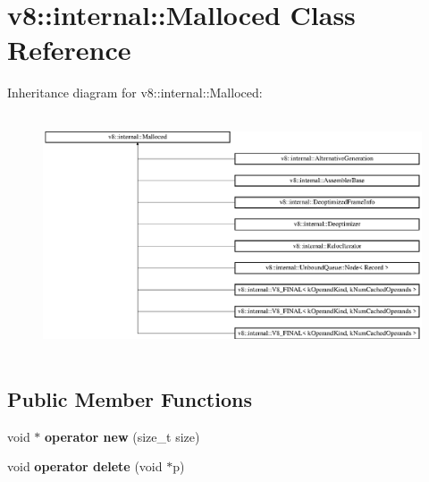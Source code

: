 \hypertarget{classv8_1_1internal_1_1_malloced}{}\section{v8\+:\+:internal\+:\+:Malloced Class Reference}
\label{classv8_1_1internal_1_1_malloced}
Inheritance diagram for v8\+:\+:internal\+:\+:Malloced\+:\begin{figure}[H]
\begin{center}
\leavevmode
\includegraphics[height=7.142857cm]{classv8_1_1internal_1_1_malloced}
\end{center}
\end{figure}
\subsection*{Public Member Functions}
\begin{DoxyCompactItemize}
\item 
\hypertarget{classv8_1_1internal_1_1_malloced_a7dca7aef948362361f6b2e38962472e3}{}void $\ast$ {\bfseries operator new} (size\+\_\+t size)\label{classv8_1_1internal_1_1_malloced_a7dca7aef948362361f6b2e38962472e3}

\item 
\hypertarget{classv8_1_1internal_1_1_malloced_ab53b7aaa07615d36caa3edc49bfc6019}{}void {\bfseries operator delete} (void $\ast$p)\label{classv8_1_1internal_1_1_malloced_ab53b7aaa07615d36caa3edc49bfc6019}

\end{DoxyCompactItemize}
